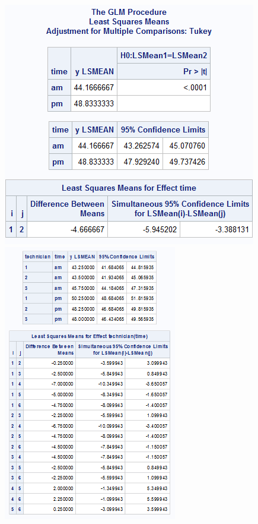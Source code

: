 \begin{enumerate}
\begin{center}
\includegraphics[scale=0.7]{NestedSAS3}\includegraphics[scale=1]{NestedSAS4}
\end{center}

\end{enumerate}